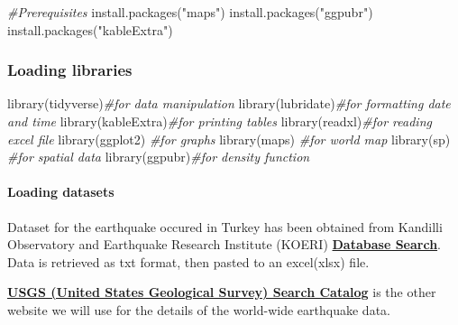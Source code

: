 \documentclass[
]{article}
\newenvironment{Shaded}{\begin{snugshade}}{\end{snugshade}}
\newcommand{\CommentTok}[1]{\textcolor[rgb]{0.56,0.35,0.01}{\textit{#1}}}
\newcommand{\FunctionTok}[1]{\textcolor[rgb]{0.00,0.00,0.00}{#1}}
\newcommand{\NormalTok}[1]{#1}
\newcommand{\StringTok}[1]{\textcolor[rgb]{0.31,0.60,0.02}{#1}}
\begin{document}
\begin{Shaded}
\begin{Highlighting}[]
\CommentTok{\#Prerequisites}
\FunctionTok{install.packages}\NormalTok{(}\StringTok{"maps"}\NormalTok{)}
\FunctionTok{install.packages}\NormalTok{(}\StringTok{"ggpubr"}\NormalTok{)}
\FunctionTok{install.packages}\NormalTok{(}\StringTok{"kableExtra"}\NormalTok{)}
\end{Highlighting}
\end{Shaded}

\hypertarget{loading-libraries}{%
\subsubsection{Loading libraries}\label{loading-libraries}}

\begin{Shaded}
\begin{Highlighting}[]
\FunctionTok{library}\NormalTok{(tidyverse)}\CommentTok{\#for data manipulation}
\FunctionTok{library}\NormalTok{(lubridate)}\CommentTok{\#for formatting date and time}
\FunctionTok{library}\NormalTok{(kableExtra)}\CommentTok{\#for printing tables}
\FunctionTok{library}\NormalTok{(readxl)}\CommentTok{\#for reading excel file}
\FunctionTok{library}\NormalTok{(ggplot2) }\CommentTok{\#for graphs}
\FunctionTok{library}\NormalTok{(maps) }\CommentTok{\#for world map}
\FunctionTok{library}\NormalTok{(sp) }\CommentTok{\#for spatial data}
\FunctionTok{library}\NormalTok{(ggpubr)}\CommentTok{\#for density function}
\end{Highlighting}
\end{Shaded}

\hypertarget{loading-datasets}{%
\paragraph{Loading datasets}\label{loading-datasets}}

Dataset for the earthquake occured in Turkey has been obtained from
Kandilli Observatory and Earthquake Research Institute (KOERI)
\href{http://www.koeri.boun.edu.tr/sismo/zeqdb/}{\textbf{Database
Search}}. Data is retrieved as txt format, then pasted to an excel(xlsx)
file.

\href{https://earthquake.usgs.gov/earthquakes/search/}{\textbf{USGS
(United States Geological Survey) Search Catalog}} is the other website
we will use for the details of the world-wide earthquake data.
\end{document}
